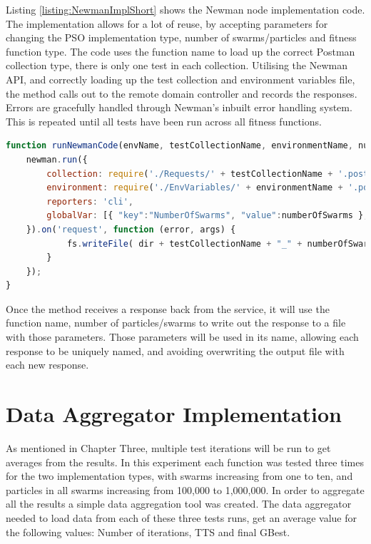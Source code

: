 \documentclass[oneside,12pt]{book}
\begin{document}
Listing \ref{listing:NewmanImplShort} shows the Newman node implementation code. The implementation allows for a lot of reuse, by accepting parameters for changing the PSO implementation type, number of swarms/particles and fitness function type. The code uses the function name to load up the correct Postman collection type, there is only one test in each collection. Utilising the Newman API, and correctly loading up the test collection and environment variables file, the method calls out to the remote domain controller and records the responses. Errors are gracefully handled through Newman's inbuilt error handling system. This is repeated until all tests have been run across all fitness functions. 

\begin{lstlisting}[basicstyle=\footnotesize, language=JavaScript]
function runNewmanCode(envName, testCollectionName, environmentName, numberOfSwarms, numberOfParticles, baseUrlsSting, endpoint) {
    newman.run({
        collection: require('./Requests/' + testCollectionName + '.postman_collection.json'),
        environment: require('./EnvVariables/' + environmentName + '.postman_environment.json'),
        reporters: 'cli',
        globalVar: [{ "key":"NumberOfSwarms", "value":numberOfSwarms }, {"key":"endpoint", "value": endpoint}, { "key":"NumberOfParticles", "value": numberOfParticles}, { "key":"BaseUrls", "value": baseUrlsSting}]
    }).on('request', function (error, args) {
            fs.writeFile( dir + testCollectionName + "_" + numberOfSwarms + "_" + numberOfParticles + '.result.json', args.response.stream, function (error)
        }
    });
}
\end{lstlisting}
\label{listing:NewmanImplShort}

Once the method receives a response back from the service, it will use the function name, number of particles/swarms to write out the response to a file with those parameters. Those parameters will be used in its name, allowing each response to be uniquely named, and avoiding overwriting the output file with each new response. 

\section{Data Aggregator Implementation}
As mentioned in Chapter Three, multiple test iterations will be run to get averages from the results. In this experiment each function was tested three times for the two implementation types, with swarms increasing from one to ten, and particles in all swarms increasing from 100,000 to 1,000,000. In order to aggregate all the results a simple data aggregation tool was created. The data aggregator needed to load data from each of these three tests runs, get an average value for the following values: Number of iterations, TTS and final GBest. 
\end{document}
